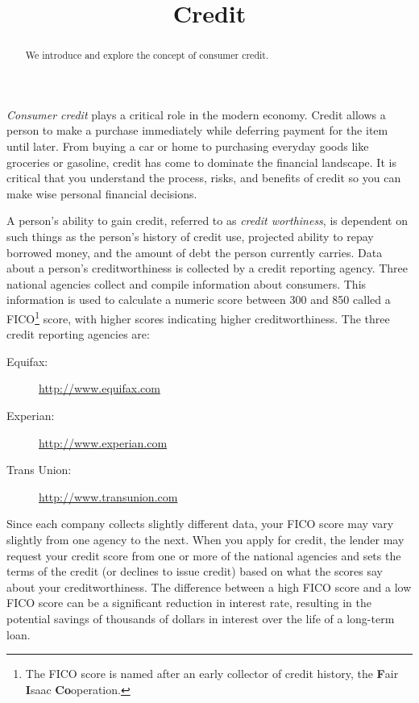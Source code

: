 \documentclass{ximera}
\title{Credit}
\begin{document}
\begin{abstract}
We introduce and explore the concept of consumer credit.
\end{abstract}

\maketitle

\emph{Consumer credit} plays a critical role in the modern economy. Credit allows a person to make a purchase immediately while deferring payment for the item until later. From buying a car or home to purchasing everyday goods like groceries or gasoline, credit has come to dominate the financial landscape. It is critical that you understand the process, risks, and benefits of credit so you can make wise personal financial decisions.

A person's ability to gain credit, referred to as \emph{credit worthiness}, is dependent on such things as the person's history of credit use, projected ability to repay borrowed money, and the amount of debt the person currently carries. Data about a person's creditworthiness is collected by a credit reporting agency. Three national agencies collect and compile information about consumers. This information is used to calculate a numeric score between 300 and 850 called a FICO\footnote{The FICO score is named after an early collector of credit history, the \textbf{F}air \textbf{I}saac \textbf{Co}operation.} score, with higher scores indicating higher creditworthiness. The three credit reporting agencies are:
\begin{description}
\item[Equifax:] \href{http://www.equifax.com}{http://www.equifax.com}
\item[Experian:] \href{http://www.experian.com}{http://www.experian.com}
\item[Trans Union:] \href{http://www.transunion.com}{http://www.transunion.com}
\end{description}

Since each company collects slightly different data, your FICO score may vary slightly from one agency to the next.  When you apply for credit, the lender may request your credit score from one or more of the national agencies and sets the terms of the credit (or declines to issue credit) based on what the scores say about your creditworthiness. The difference between a high FICO score and a low FICO score can be a significant reduction in interest rate, resulting in the potential savings of thousands of dollars in interest over the life of a long-term loan.
\end{document}
